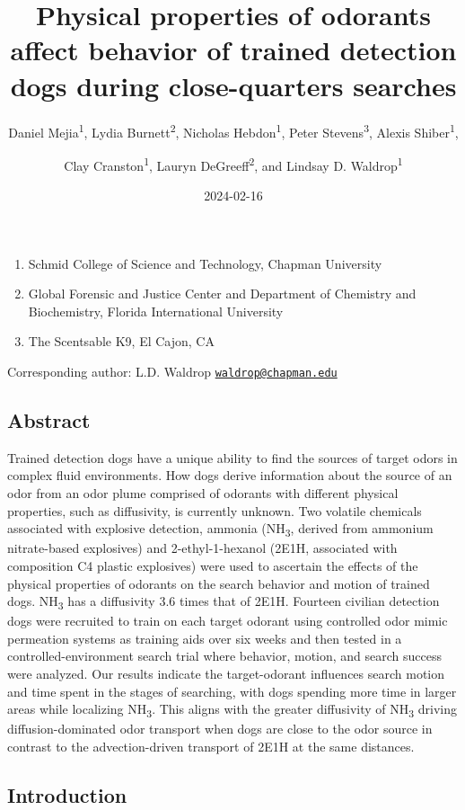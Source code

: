 \documentclass[
]{article}
\title{Physical properties of odorants affect behavior of trained detection dogs during close-quarters searches}
\author{Daniel Mejia\textsuperscript{1}, Lydia Burnett\textsuperscript{2}, Nicholas Hebdon\textsuperscript{1}, Peter Stevens\textsuperscript{3}, Alexis Shiber\textsuperscript{1}, \and Clay Cranston\textsuperscript{1}, Lauryn DeGreeff\textsuperscript{2}, and Lindsay D. Waldrop\textsuperscript{1}}
\date{2024-02-16}
\providecommand{\tightlist}{%
  \setlength{\itemsep}{0pt}\setlength{\parskip}{0pt}}
\begin{document}
\maketitle

\begin{enumerate}
\def\labelenumi{\arabic{enumi}.}
\tightlist
\item
  Schmid College of Science and Technology, Chapman University
\item
  Global Forensic and Justice Center and Department of Chemistry and Biochemistry, Florida International University
\item
  The Scentsable K9, El Cajon, CA
\end{enumerate}

Corresponding author: L.D. Waldrop \href{mailto:waldrop@chapman.edu}{\nolinkurl{waldrop@chapman.edu}}

\hypertarget{abstract}{%
\subsection{Abstract}\label{abstract}}

Trained detection dogs have a unique ability to find the sources of target odors in complex fluid environments. How dogs derive information about the source of an odor from an odor plume comprised of odorants with different physical properties, such as diffusivity, is currently unknown. Two volatile chemicals associated with explosive detection, ammonia (NH\textsubscript{3}, derived from ammonium nitrate-based explosives) and 2-ethyl-1-hexanol (2E1H, associated with composition C4 plastic explosives) were used to ascertain the effects of the physical properties of odorants on the search behavior and motion of trained dogs. NH\textsubscript{3} has a diffusivity 3.6 times that of 2E1H. Fourteen civilian detection dogs were recruited to train on each target odorant using controlled odor mimic permeation systems as training aids over six weeks and then tested in a controlled-environment search trial where behavior, motion, and search success were analyzed. Our results indicate the target-odorant influences search motion and time spent in the stages of searching, with dogs spending more time in larger areas while localizing NH\textsubscript{3}. This aligns with the greater diffusivity of NH\textsubscript{3} driving diffusion-dominated odor transport when dogs are close to the odor source in contrast to the advection-driven transport of 2E1H at the same distances.

\hypertarget{introduction}{%
\subsection{Introduction}\label{introduction}}
\end{document}
